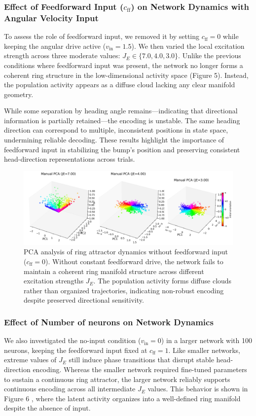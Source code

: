 \documentclass[11pt,a4paper]{article}
\begin{document}
\subsubsection*{Effect of Feedforward Input (\( c_{\text{ff}} \)) on Network Dynamics with Angular Velocity Input}
To assess the role of feedforward input, we removed it by setting \( c_{\text{ff}} = 0 \) while keeping the angular drive active (\( v_{\text{in}} = 1.5 \)). We then varied the local excitation strength across three moderate values: \( J_E \in \{7.0, 4.0, 3.0\} \). Unlike the previous conditions where feedforward input was present, the network no longer forms a coherent ring structure in the low-dimensional activity space (Figure 5). Instead, the population activity appears as a diffuse cloud lacking any clear manifold geometry.

While some separation by heading angle remains—indicating that directional information is partially retained—the encoding is unstable. The same heading direction can correspond to multiple, inconsistent positions in state space, undermining reliable decoding. These results highlight the importance of feedforward input in stabilizing the bump’s position and preserving consistent head-direction representations across trials.

\begin{figure}[H]
\centering
\includegraphics[width=1.0\textwidth]{manual_pca_cff_zero.png}
\caption{PCA analysis of ring attractor dynamics without feedforward input (\( c_{\text{ff}} = 0 \)). Without constant feedforward drive, the network fails to maintain a coherent ring manifold structure across different excitation strengths \( J_E \). The population activity forms diffuse clouds rather than organized trajectories, indicating non-robust encoding despite preserved directional sensitivity.}
\label{fig:pca_cff_zero}
\end{figure}


\subsubsection*{Effect of Number of neurons on Network Dynamics}
We also investigated the no-input condition (\( v_{\text{in}} = 0 \)) in a larger network with 100 neurons, keeping the feedforward input fixed at \( c_{\text{ff}} = 1 \). Like smaller networks, extreme values of \( J_E \) still induce phase transitions that disrupt stable head-direction encoding. Whereas the smaller network required fine-tuned parameters to sustain a continuous ring attractor, the larger network reliably supports continuous encoding across all intermediate \( J_E \) values. This behavior is shown in Figure 6 , where the latent activity organizes into a well-defined ring manifold despite the absence of input.
\end{document}
